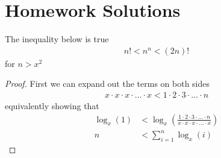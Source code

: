 \chapter{Homework Solutions}
\begin{lemma}
  The inequality below is true
  \begin{align*}
    n!<n^n<(2n)!
  \end{align*}
  for $n>x^2$
\end{lemma}
\begin{proof}
  First we can expand out the terms on both sides
  \begin{align*}
    {x\cdot x \cdot x \cdot \dots \cdot x}<{1\cdot 2 \cdot 3\cdot \dots \cdot n}
  \end{align*}
  equivalently showing that
  \begin{align*}
    \log_x(1)&< \log_x \left(\frac{1\cdot 2 \cdot 3\cdot \dots \cdot n}{x\cdot x \cdot x \cdot \dots \cdot x}\right)\\
    n&<\sum_{i=1}^n \log_x(i)
  \end{align*}
\end{proof}

